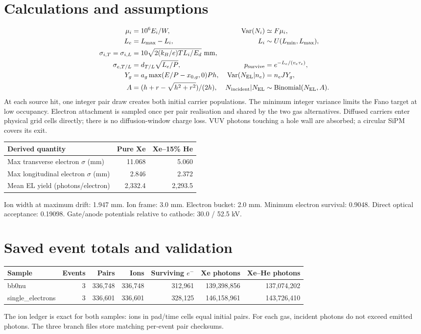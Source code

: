 \documentclass[11pt]{article}
\begin{document}
\section*{Calculations and assumptions}
\begin{align*}
\mu_i &= 10^6 E_i/W, &\operatorname{Var}(N_i)&\simeq F\mu_i,\\
L_e &= L_{\max}-L_i, & L_i&\sim U(L_{\min},L_{\max}),\\
\sigma_{i,T}=\sigma_{i,L}&=10\sqrt{2(k_B/e)TL_i/E_d}\ {\rm mm},\\
\sigma_{e,T/L}&=d_{T/L}\sqrt{L_e/P}, &p_{\rm survive}&=e^{-L_e/(v_e\tau_e)},\\
Y_g&=a_g\max(E/P-x_{0,g},0)Ph, &\operatorname{Var}(N_{\rm EL}|n_e)&=n_e JY_g,\\
A&=(h+r-\sqrt{h^2+r^2})/(2h), &N_{\rm incident}|N_{\rm EL}&\sim\mathrm{Binomial}(N_{\rm EL},A).
\end{align*}
At each source hit, one integer pair draw creates both initial carrier populations. The minimum integer variance limits the Fano target at low occupancy. Electron attachment is sampled once per pair realisation and shared by the two gas alternatives. Diffused carriers enter physical grid cells directly; there is no diffusion-window charge loss. VUV photons touching a hole wall are absorbed; a circular SiPM covers its exit.
\par\medskip
\begin{tabular}{lrr}\toprule Derived quantity & Pure Xe & Xe--15\% He\\\midrule
Max transverse electron $\sigma$ (mm) & 11.068 & 5.060\\
Max longitudinal electron $\sigma$ (mm) & 2.846 & 2.372\\
Mean EL yield (photons/electron) & 2,332.4 & 2,293.5\\
\bottomrule\end{tabular}
\par Ion width at maximum drift: 1.947 mm. Ion frame: 3.0 mm. Electron bucket: 2.0 mm. Minimum electron survival: 0.9048. Direct optical acceptance: 0.19098. Gate/anode potentials relative to cathode: 30.0 / 52.5 kV.
\section*{Saved event totals and validation}
\begin{tabular}{lrrrrrr}\toprule Sample & Events & Pairs & Ions & Surviving $e^-$ & Xe photons & Xe--He photons\\\midrule
bb0nu & 3 & 336,748 & 336,748 & 312,961 & 139,398,856 & 137,074,202\\
single\_electrons & 3 & 336,601 & 336,601 & 328,125 & 146,158,961 & 143,726,410\\
\bottomrule\end{tabular}
\par The ion ledger is exact for both samples: ions in pad/time cells equal initial pairs. For each gas, incident photons do not exceed emitted photons. The three branch files store matching per-event pair checksums.
\end{document}
